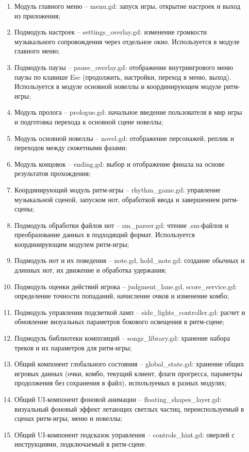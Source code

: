 \documentclass[utf8, russian]{eskdtext}
\numberwithin{equation}{section}
\newcounter{game_cnt}
\begin{document}
\begin{enumerate}
    \item Модуль главного меню -- menu.gd: запуск игры, открытие настроек и выход из приложения;
    \item Подмодуль настроек -- settings\_overlay.gd: изменение громкости музыкального сопровождения через отдельное окно. Используется в модуле главного меню;
    \item Подмодуль паузы -- pause\_overlay.gd: отображение внутриигрового меню паузы по клавише Esc (продолжить, настройки, переход в меню, выход). Используется в модуле основной новеллы и координирующем модуле ритм-игры;
    \item Модуль пролога -- prologue.gd: начальное введение пользователя в мир игры и подготовка перехода к основной сцене новеллы;
    \item Модуль основной новеллы -- novel.gd: отображение персонажей, реплик и переходов между сюжетными фазами;
    \item Модуль концовок -- ending.gd: выбор и отображение финала на основе результатов прохождения;
    \item Координирующий модуль ритм-игры -- rhythm\_game.gd: управление музыкальной сценой, запуском нот, обработкой ввода и завершением ритм-сцены;
    \item Подмодуль обработки файлов нот -- sm\_parser.gd: чтение .sm-файлов и преобразование данных в подходящий формат. Используется координирующим модулем ритм-игры;
    \item Подмодуль нот и их поведения -- note.gd, hold\_note.gd: создание обычных и длинных нот, их движение и обработка удержания;
    \item Подмодуль оценки действий игрока -- judgment\_lane.gd, score\_service.gd: определение точности попаданий, начисление очков и изменение комбо;
    \item Подмодуль управления подсветкой ламп -- side\_lights\_controller.gd: расчет и обновление визуальных параметров бокового освещения в ритм-сцене;
    \item Подмодуль библиотеки композиций -- songs\_library.gd: хранение набора треков и их параметров для ритм-игры;
    \item Общий компонент глобального состояния -- global\_state.gd: хранение общих игровых данных (очки, комбо, текущий клиент, флаги прогресса, параметры продолжения без сохранения в файл), используемых в разных модулях;
    \item Общий UI-компонент фоновой анимации -- floating\_shapes\_layer.gd: визуальный фоновый эффект летающих светлых частиц, переиспользуемый в сценах ритм-игры, меню и новеллы;
    \item Общий UI-компонент подсказок управления -- controls\_hint.gd: оверлей с инструкциями, подключаемый в ритм-сцене.
\end{enumerate}
\end{document}
